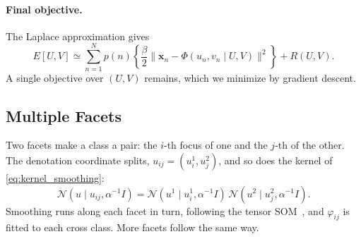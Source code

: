 \paragraph{Final objective.}
The Laplace approximation gives
\begin{equation}\label{eq:reduced_objective}
    E[U, V] \simeq \sum_{n=1}^N p(n) \left\{
    \frac{\beta}{2}\bigl\| \mathbf{x}_n - \Phi(u_n, v_n \mid U, V)
    \bigr\|^2
    \right\}+ R(U,V).
\end{equation}
A single objective over $(U, V)$ remains, which we minimize by
gradient descent.



\subsection{Multiple Facets}

Two facets make a class a pair: the $i$-th focus of one and the $j$-th
of the other. The denotation coordinate splits, $u_{ij} = (u^1_i,
    u^2_j)$, and so does the kernel of \eqref{eq:kernel_smoothing}:
\begin{equation*}
    \mathcal{N}(u \mid u_{ij}, \alpha^{-1} I) =
    \mathcal{N}(u^1 \mid u^1_i, \alpha^{-1} I)\,
    \mathcal{N}(u^2 \mid u^2_j, \alpha^{-1} I).
\end{equation*}
Smoothing runs along each facet in turn, following the tensor
SOM~\citep{Iwasaki2016107}, and $\varphi_{ij}$ is fitted to each cross
class. More facets follow the same way.